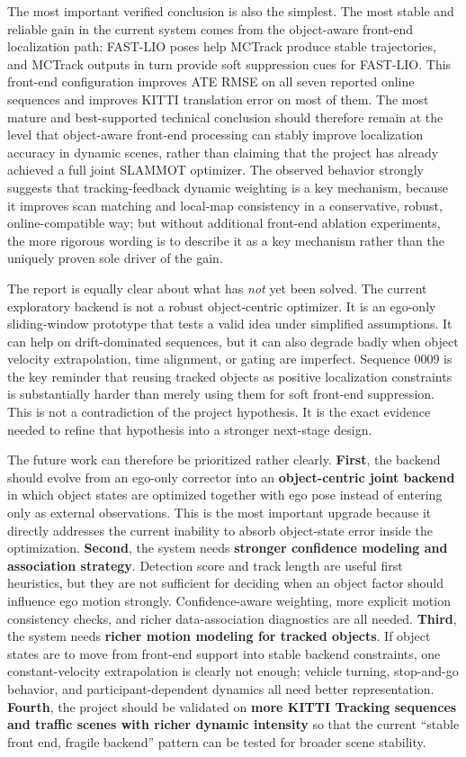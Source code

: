 \documentclass[a4paper,12pt]{article}
\begin{document}
The most important verified conclusion is also the simplest. The most stable and reliable gain in the current system comes from the object-aware front-end localization path: FAST-LIO poses help MCTrack produce stable trajectories, and MCTrack outputs in turn provide soft suppression cues for FAST-LIO. This front-end configuration improves ATE RMSE on all seven reported online sequences and improves KITTI translation error on most of them. The most mature and best-supported technical conclusion should therefore remain at the level that object-aware front-end processing can stably improve localization accuracy in dynamic scenes, rather than claiming that the project has already achieved a full joint SLAMMOT optimizer. The observed behavior strongly suggests that tracking-feedback dynamic weighting is a key mechanism, because it improves scan matching and local-map consistency in a conservative, robust, online-compatible way; but without additional front-end ablation experiments, the more rigorous wording is to describe it as a key mechanism rather than the uniquely proven sole driver of the gain.

The report is equally clear about what has \emph{not} yet been solved. The current exploratory backend is not a robust object-centric optimizer. It is an ego-only sliding-window prototype that tests a valid idea under simplified assumptions. It can help on drift-dominated sequences, but it can also degrade badly when object velocity extrapolation, time alignment, or gating are imperfect. Sequence 0009 is the key reminder that reusing tracked objects as positive localization constraints is substantially harder than merely using them for soft front-end suppression. This is not a contradiction of the project hypothesis. It is the exact evidence needed to refine that hypothesis into a stronger next-stage design.

The future work can therefore be prioritized rather clearly. \textbf{First}, the backend should evolve from an ego-only corrector into an \textbf{object-centric joint backend} in which object states are optimized together with ego pose instead of entering only as external observations. This is the most important upgrade because it directly addresses the current inability to absorb object-state error inside the optimization. \textbf{Second}, the system needs \textbf{stronger confidence modeling and association strategy}. Detection score and track length are useful first heuristics, but they are not sufficient for deciding when an object factor should influence ego motion strongly. Confidence-aware weighting, more explicit motion consistency checks, and richer data-association diagnostics are all needed. \textbf{Third}, the system needs \textbf{richer motion modeling for tracked objects}. If object states are to move from front-end support into stable backend constraints, one constant-velocity extrapolation is clearly not enough; vehicle turning, stop-and-go behavior, and participant-dependent dynamics all need better representation. \textbf{Fourth}, the project should be validated on \textbf{more KITTI Tracking sequences and traffic scenes with richer dynamic intensity} so that the current ``stable front end, fragile backend'' pattern can be tested for broader scene stability.
\end{document}
